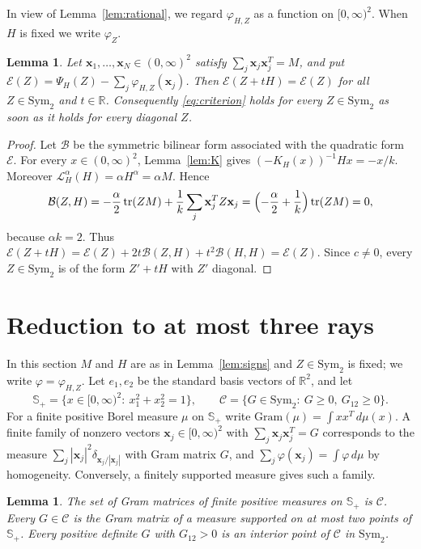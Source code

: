 \documentclass[11pt]{amsart}
\newtheorem{lemma}[theorem]{Lemma}
\theoremstyle{definition}
\theoremstyle{remark}
\numberwithin{equation}{section}
\newcommand{\R}{\mathbb{R}}
\newcommand{\tr}{\operatorname{tr}}
\newcommand{\Sym}{\mathrm{Sym}_2}
\newcommand{\cC}{\mathcal{C}}
\newcommand{\cL}{\mathcal{L}}
\newcommand{\Sp}{\mathbb{S}_+}
\newcommand{\bx}{\mathbf{x}}
\begin{document}
In view of Lemma~\ref{lem:rational}, we regard $\varphi_{H,Z}$ as a function on $[0,\infty)^2$. When $H$ is fixed we write $\varphi_Z$.

\begin{lemma}\label{lem:gauge}
Let $\bx_1,\dots,\bx_N\in(0,\infty)^2$ satisfy $\sum_j\bx_j\bx_j^T=M$, and put $\mathcal E(Z)=\Psi_H(Z)-\sum_j\varphi_{H,Z}(\bx_j)$. Then $\mathcal E(Z+tH)=\mathcal E(Z)$ for all $Z\in\Sym$ and $t\in\R$. Consequently \eqref{eq:criterion} holds for every $Z\in\Sym$ as soon as it holds for every diagonal $Z$.
\end{lemma}

\begin{proof}
Let $\mathcal B$ be the symmetric bilinear form associated with the quadratic form $\mathcal E$. For every $x\in(0,\infty)^2$, Lemma~\ref{lem:K} gives $(-K_H(x))^{-1}Hx=-x/k$. Moreover $\cL^\alpha_H(H)=\alpha H^\alpha=\alpha M$. Hence
\[
\mathcal B(Z,H)=-\frac\alpha2\tr(ZM)+\frac1k\sum_j\bx_j^TZ\bx_j=\Bigl(-\frac\alpha2+\frac1k\Bigr)\tr(ZM)=0,
\]
because $\alpha k=2$. Thus $\mathcal E(Z+tH)=\mathcal E(Z)+2t\mathcal B(Z,H)+t^2\mathcal B(H,H)=\mathcal E(Z)$. Since $c\ne0$, every $Z\in\Sym$ is of the form $Z'+tH$ with $Z'$ diagonal.
\end{proof}

\section{Reduction to at most three rays}\label{sec:rays}

In this section $M$ and $H$ are as in Lemma~\ref{lem:signs} and $Z\in\Sym$ is fixed; we write $\varphi=\varphi_{H,Z}$. Let $e_1,e_2$ be the standard basis vectors of $\R^2$, and let
\[
\Sp=\{x\in[0,\infty)^2:\ x_1^2+x_2^2=1\},\qquad \cC=\{G\in\Sym:\ G\ge0,\ G_{12}\ge0\}.
\]
For a finite positive Borel measure $\mu$ on $\Sp$ write $\mathrm{Gram}(\mu)=\int xx^T\,d\mu(x)$. A finite family of nonzero vectors $\bx_j\in[0,\infty)^2$ with $\sum_j\bx_j\bx_j^T=G$ corresponds to the measure $\sum_j|\bx_j|^2\delta_{\bx_j/|\bx_j|}$ with Gram matrix $G$, and $\sum_j\varphi(\bx_j)=\int\varphi\,d\mu$ by homogeneity. Conversely, a finitely supported measure gives such a family.

\begin{lemma}\label{lem:cone}
The set of Gram matrices of finite positive measures on $\Sp$ is $\cC$. Every $G\in\cC$ is the Gram matrix of a measure supported on at most two points of $\Sp$. Every positive definite $G$ with $G_{12}>0$ is an interior point of $\cC$ in $\Sym$.
\end{lemma}
\end{document}

